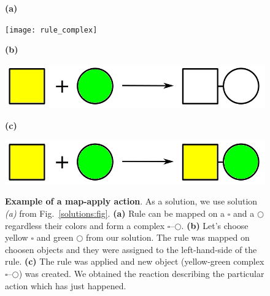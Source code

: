\documentclass{elsarticle}
\begin{document}
\begin{figure}
\begin{center}
\begin{minipage}[l]{0.1\textwidth}
    \textbf{(a)}
  \end{minipage}
  \begin{minipage}[r]{0.6\textwidth}
    {\hspace*{1.3cm}\texttt{[image: rule\_complex]}}
\end{minipage}

\begin{minipage}[l]{0.1\textwidth}
    \textbf{(b)}
  \end{minipage}
  \begin{minipage}[r]{0.6\textwidth}
    {\hspace*{1.3cm}\includegraphics[scale=0.2]{rule_complex_mapped}}
\end{minipage}

\begin{minipage}[l]{0.1\textwidth}
    \textbf{(c)}
  \end{minipage}
  \begin{minipage}[r]{0.6\textwidth}
    {\hspace*{1.3cm}\includegraphics[scale=0.2]{rule_reaction}}
\end{minipage}
\caption{\textbf{Example of a map-apply action}. As a solution, we use solution \textit{(a)} from Fig.~\ref{solutions:fig}. \textbf{(a)} Rule can be mapped on a $\square$ and a $\bigcirc$ regardless their colors and form a complex $\square$--$\bigcirc$.  \textbf{(b)} Let's choose yellow $\square$ and green $\bigcirc$ from our solution. The rule was mapped on choosen objects and they were assigned to the left-hand-side of the rule. \textbf{(c)} The rule was applied and new object (yellow-green complex $\square$--$\bigcirc$) was created. We obtained the reaction describing the particular action which has just happened.}
\label{map-apply:fig}
\end{center}
\end{figure}
\end{document}
